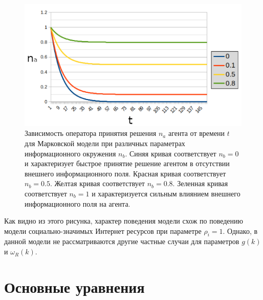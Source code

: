 \begin{figure}[h!]
    \centering
    \captionsetup{justification=centering}
    \includegraphics[width=0.9\linewidth]{pictures/at_baga.png}
    \caption{Зависимость оператора принятия решения $n_{a}$ агента от времени $t$ для Марковской
    модели при различных параметрах информационного окружения $n_{b}$. Синяя кривая соответствует
    $n_{b} = 0$ и характеризует быстрое принятие решение агентом в отсутствии внешнего информационного
    поля. Красная кривая соответствует $n_{b} = 0.5$. Желтая кривая соответствует $n_{b} = 0.8$.
    Зеленная кривая соответствует $n_{b} = 1$ и характеризуется сильным влиянием внешнего информационного
    поля на агента.}
    \label{fig:at_baga}
\end{figure}

Как видно из этого рисунка, характер поведения модели схож по поведению модели социально-значимых
Интернет ресурсов при параметре $\rho_{i} = 1$.
Однако, в данной модели не рассматриваются другие частные случаи для параметров $g(k)$ и $\omega_{R}(k)$.

\section{Основные уравнения}

